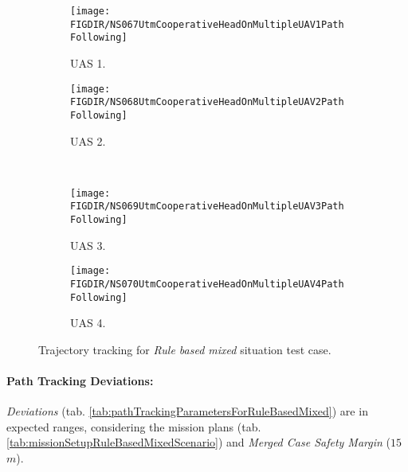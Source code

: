     \begin{figure}[H]
        \centering
        \begin{subfigure}{0.48\textwidth}
        	\centering
            \texttt{[image: \\FIGDIR/NS067UtmCooperativeHeadOnMultipleUAV1PathFollowing]}
            \caption{UAS 1.}
            \label{fig:ruleBasedMixedPathTrackingUAS1}
        \end{subfigure}
        \begin{subfigure}{0.48\textwidth}
        	\centering
            \texttt{[image: \\FIGDIR/NS068UtmCooperativeHeadOnMultipleUAV2PathFollowing]} 
            \caption{UAS 2.}
            \label{fig:ruleBasedMixedPathTrackingUAS2}
        \end{subfigure}
        \\
        \begin{subfigure}{0.48\textwidth}
        	\centering
            \texttt{[image: \\FIGDIR/NS069UtmCooperativeHeadOnMultipleUAV3PathFollowing]} 
            \caption{UAS 3.}
            \label{fig:ruleBasedMixedPathTrackingUAS3}
        \end{subfigure}
        \begin{subfigure}{0.48\textwidth}
        	\centering
            \texttt{[image: \\FIGDIR/NS070UtmCooperativeHeadOnMultipleUAV4PathFollowing]} 
            \caption{UAS 4.}
            \label{fig:ruleBasedMixedPathTrackingUAS4}
        \end{subfigure}
        \caption{Trajectory tracking for \emph{Rule based mixed} situation test case.}
        \label{fig:testCaseRuleBasedMixedTrajectoryTracking}
    \end{figure}
    
    \paragraph{Path Tracking Deviations:} \emph{Deviations} (tab. \ref{tab:pathTrackingParametersForRuleBasedMixed}) are in expected ranges, considering the mission plans (tab. \ref{tab:missionSetupRuleBasedMixedScenario}) and \emph{Merged Case Safety Margin} ($15$ $m$).
    

